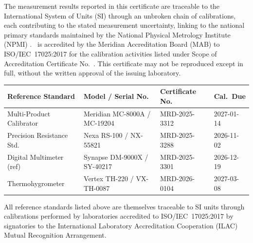 
The measurement results reported in this certificate are traceable to the International
System of Units (SI) through an unbroken chain of calibrations, each contributing to the
stated measurement uncertainty, linking to the national primary standards maintained by
the National Physical Metrology Institute (NPMI) \cite{vim2012}. \CertLabName\ is accredited
by the Meridian Accreditation Board (MAB) to ISO/IEC~17025:2017 \cite{iso17025} for the
calibration activities listed under Scope of Accreditation Certificate No.\ \CertAccredNo.
This certificate may not be reproduced except in full, without the written approval of the
issuing laboratory.

\vspace{4pt}
\begin{center}
\small
\begin{tabular}{@{}llll@{}}
  \toprule
  Reference Standard & Model / Serial No.\ & Certificate No.\ & Cal.\ Due \\
  \midrule
  Multi-Product Calibrator & Meridian MC-8000A / MC-19204 & MRD-2025-3312 & 2027-01-14 \\
  Precision Resistance Std.\ & Nexa RS-100 / NX-55821 & MRD-2025-3288 & 2026-11-02 \\
  Digital Multimeter (ref) & Synapse DM-9000X / SY-40217 & MRD-2025-3301 & 2026-12-19 \\
  Thermohygrometer & Vertex TH-220 / VX-TH-0087 & MRD-2026-0104 & 2027-03-08 \\
  \bottomrule
\end{tabular}
\end{center}

\vspace{2pt}
{\small\color{certgray} All reference standards listed above are themselves traceable to SI
units through calibrations performed by laboratories accredited to ISO/IEC~17025:2017 by
signatories to the International Laboratory Accreditation Cooperation (ILAC) Mutual
Recognition Arrangement.}
